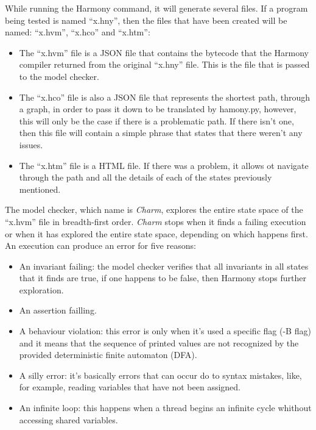 \documentclass[runningheads]{llncs}
\begin{document}
While running the Harmony command, it will generate several files. If a program being tested is named ``x.hny'',
then the files that have been created will be named: ``x.hvm'', ``x.hco'' and ``x.htm'':
\begin{itemize}
    \item The ``x.hvm'' file is a JSON file that contains the bytecode that the Harmony compiler returned
	    from the original ``x.hny'' file. This is the file that is passed to the model checker.
    \item The ``x.hco'' file is also a JSON file that represents the shortest path,
	    through a graph, in order to pass it down to be translated by hamony.py, however, this
		will only be the case if there is a problematic path. If there isn't one, then
		this file will contain a simple phrase that states that there weren't any issues.
    \item The ``x.htm'' file is a HTML file. If there was a problem, it allows ot navigate through the path and
	    all the details of each of the states previously mentioned.
\end{itemize}

The model checker, which name is \textit{Charm}, explores the entire state space of the ``x.hvm'' file in breadth-first order.
\textit{Charm} stops when it finds a failing execution or when it has explored the entire state space,
depending on which happens first. An execution can produce an error for five reasons:
\begin{itemize}
    \item An invariant failing: the model checker verifies that all invariants in all states that it
	    finds are true, if one happens to be false, then Harmony stops further exploration.
    \item An assertion failling.
    \item A behaviour violation: this error is only when it's used a specific flag (-B flag)
	    and it means that the sequence of printed values are not recognized by the provided deterministic
		finite automaton (DFA).
    \item A silly error: it's basically errors that can occur do to syntax mistakes, like, for example,
	    reading variables that have not been assigned.
    \item An infinite loop: this happens when a thread begins an infinite cycle whithout accessing shared variables.
\end{itemize}
\end{document}
